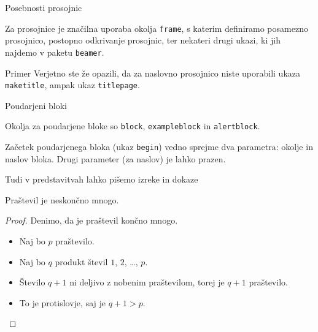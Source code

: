 \begin{frame}{Posebnosti prosojnic}

	Za prosojnice je značilna uporaba okolja \texttt{frame},
	s katerim definiramo posamezno prosojnico,
	\pause
	postopno odkrivanje prosojnic,
	\pause
	ter nekateri drugi ukazi, ki jih najdemo v paketu \texttt{beamer}.
	\pause
	\begin{exampleblock}{Primer}
		Verjetno ste že opazili, da za naslovno prosojnico niste uporabili
		ukaza \texttt{maketitle}, ampak ukaz \texttt{titlepage}.
	\end{exampleblock}
\end{frame}

\begin{frame}{Poudarjeni bloki}


	\begin{block}
		Okolja za poudarjene bloke so \texttt{block}, \texttt{exampleblock} in \texttt{alertblock}.
	\end{block}

			
	\begin{alertblock}
		Začetek poudarjenega bloka (ukaz \texttt{begin}) vedno sprejme 
		dva parametra: okolje in naslov bloka.
		Drugi parameter (za naslov) je lahko prazen.
	\end{alertblock} 

\end{frame}

\begin{frame}{Tudi v predstavitvah lahko pišemo izreke in dokaze}

	\begin{izrek}
	   Praštevil je neskončno mnogo.
	\end{izrek}
	\begin{proof}
	   Denimo, da je praštevil končno mnogo.
	   \begin{itemize}[<+->]
		  \item Naj bo $p$  praštevilo.
		  \item Naj bo $q$ produkt števil $1$, $2$, \ldots, $p$.
		  \item Število $q+1$ ni deljivo z nobenim praštevilom, torej je $q+1$ praštevilo.
		  \item To je protislovje, saj je $q+1>p$. \qedhere
	   \end{itemize}
	\end{proof}
 \end{frame}
 